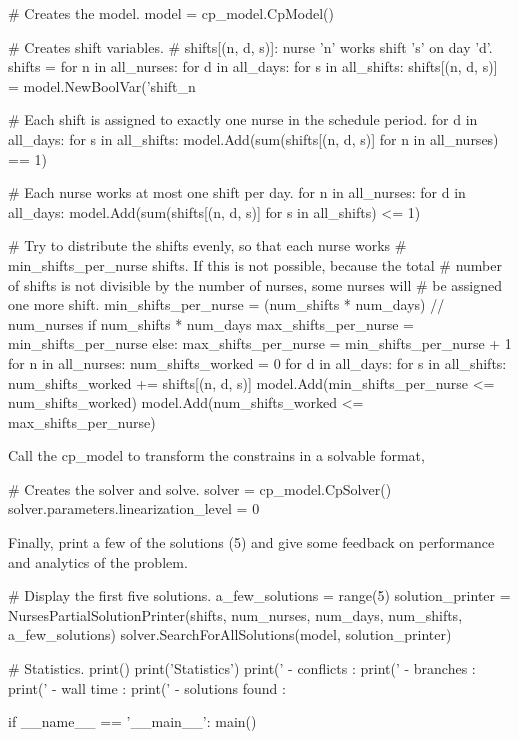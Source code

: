 \documentclass[
12pt,				%
openright,			%
oneside,			%
a4paper,			%
brazil,				%
english,			  %
]{abntex2}
\begin{document}
\begin{python}
    # Creates the model.
    model = cp_model.CpModel()

    # Creates shift variables.
    # shifts[(n, d, s)]: nurse 'n' works shift 's' on day 'd'.
    shifts = {}
    for n in all_nurses:
        for d in all_days:
            for s in all_shifts:
                shifts[(n, d,
                        s)] = model.NewBoolVar('shift_n%

    # Each shift is assigned to exactly one nurse in the schedule period.
    for d in all_days:
        for s in all_shifts:
            model.Add(sum(shifts[(n, d, s)] for n in all_nurses) == 1)

    # Each nurse works at most one shift per day.
    for n in all_nurses:
        for d in all_days:
            model.Add(sum(shifts[(n, d, s)] for s in all_shifts) <= 1)

    # Try to distribute the shifts evenly, so that each nurse works
    # min_shifts_per_nurse shifts. If this is not possible, because the total
    # number of shifts is not divisible by the number of nurses, some nurses will
    # be assigned one more shift.
    min_shifts_per_nurse = (num_shifts * num_days) // num_nurses
    if num_shifts * num_days %
        max_shifts_per_nurse = min_shifts_per_nurse
    else:
        max_shifts_per_nurse = min_shifts_per_nurse + 1
    for n in all_nurses:
        num_shifts_worked = 0
        for d in all_days:
            for s in all_shifts:
                num_shifts_worked += shifts[(n, d, s)]
        model.Add(min_shifts_per_nurse <= num_shifts_worked)
        model.Add(num_shifts_worked <= max_shifts_per_nurse)
\end{python}

Call the cp_model to transform the constrains in a solvable format,

\begin{python}
    # Creates the solver and solve.
    solver = cp_model.CpSolver()
    solver.parameters.linearization_level = 0
\end{python}

Finally, print a few of the solutions (5) and give some feedback on
performance and analytics of the problem.

\begin{python}
    # Display the first five solutions.
    a_few_solutions = range(5)
    solution_printer = NursesPartialSolutionPrinter(shifts, num_nurses,
                                                    num_days, num_shifts,
                                                    a_few_solutions)
    solver.SearchForAllSolutions(model, solution_printer)

    # Statistics.
    print()
    print('Statistics')
    print('  - conflicts       : %
    print('  - branches        : %
    print('  - wall time       : %
    print('  - solutions found : %

if __name__ == '__main__':
    main()
\end{python}
\end{document}

